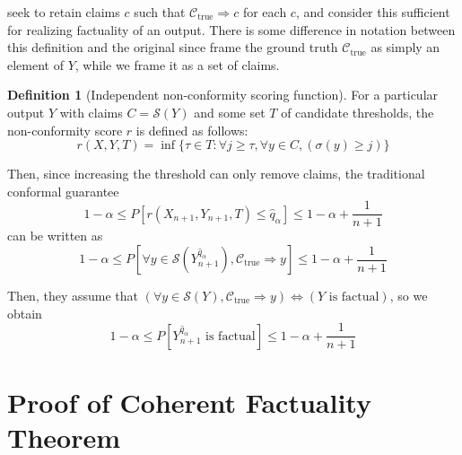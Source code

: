 \documentclass{uai2026} %
\theoremstyle{remark}
\theoremstyle{plain}
\theoremstyle{definition}
\newtheorem{definition}[theorem]{Definition}
\begin{document}
\citet{mohri2024language} seek to retain claims $c$ such that $\mathcal{C}_{\text{true}} \Rightarrow c$ for each $c$, and consider this sufficient for realizing factuality of an output. There is some difference in notation between this definition and the original since \citet{mohri2024language} frame the ground truth $\mathcal{C}_{\text{true}}$ as simply an element of $Y$, while we frame it as a set of claims.

\begin{definition}[Independent non-conformity scoring function]
For a particular output $Y$ with claims $C = \mathcal{S}(Y)$ and some set $T$ of candidate thresholds, the non-conformity score $r$ is defined as follows:
$$r(X,Y,T) = \inf\{\tau \in T : \forall j \geq \tau, \forall y \in C, (\sigma(y) \geq j) \}$$
\end{definition}

Then, since increasing the threshold can only remove claims, the traditional conformal guarantee
$$1-\alpha \leq P[r(X_{n+1},Y_{n+1},T) \leq \hat{q}_\alpha] \leq 1-\alpha + \frac{1}{n+1}$$
can be written as
$$1-\alpha \leq P[\forall y \in \mathcal{S}(Y^{\hat{q}_\alpha}_{n+1}), \mathcal{C}_{\text{true}} \Rightarrow y] \leq 1-\alpha + \frac{1}{n+1}$$

Then, they assume that $(\forall y \in \mathcal{S}(Y), \mathcal{C}_{\text{true}} \Rightarrow y) \Leftrightarrow (Y \text{ is factual})$, so we obtain
$$1-\alpha \leq P[Y^{\hat{q}_\alpha}_{n+1} \text{ is factual}] \leq 1-\alpha + \frac{1}{n+1}$$

\section{Proof of Coherent Factuality Theorem}
\label{app:coherent_proof}
\end{document}
